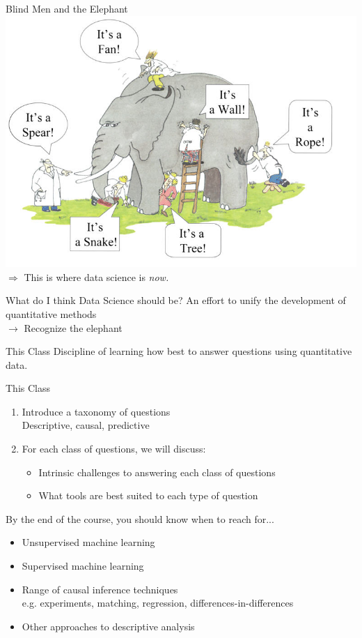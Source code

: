 \documentclass[11pt]{beamer}
\begin{document}
\begin{frame}[c]{Blind Men and the Elephant}
\pause \includegraphics[width=\textwidth]{blindmenelephant.jpg}
\pause $\Rightarrow$ This is where data science is \emph{now.}
\end{frame}

\begin{frame}[c]{What do I think Data Science should be?}
\pause An effort to unify the development of quantitative methods \\
\pause $\rightarrow$ Recognize the elephant
\end{frame}

\begin{frame}[c]{This Class}
Discipline of learning how best to \alert{answer questions} using \alert{quantitative data.}
\end{frame}

\begin{frame}[c]{This Class}
\begin{enumerate}
  \item Introduce a taxonomy of questions \\
  {\color{gray} Descriptive, causal, predictive}
  \pause \item \alert{For each class of questions}, we will discuss:
  \begin{itemize}
    \item Intrinsic challenges to answering each class of questions
    \item What tools are best suited to each type of question
  \end{itemize}
\end{enumerate}
  \pause   By the end of the course, you should know when to reach for...
  \begin{itemize}
    \pause \item Unsupervised machine learning
    \item Supervised machine learning
    \item Range of causal inference techniques \\
    {\color{gray}e.g. experiments, matching, regression, differences-in-differences}
    \item Other approaches to descriptive analysis
  \end{itemize}
\end{frame}
\end{document}
